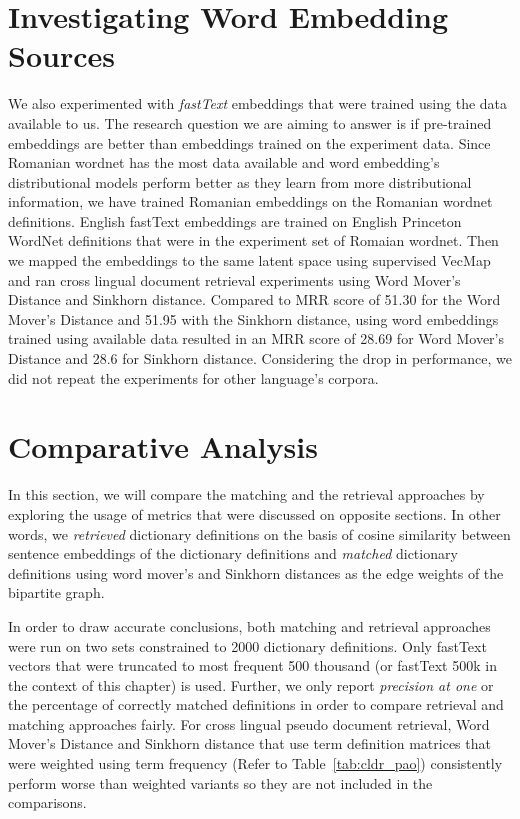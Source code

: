\section{Investigating Word Embedding Sources}%
\label{sec:investigating_word_embedding_sources}

We also experimented with \emph{fastText} embeddings that were trained using the data available to us.
The research question we are aiming to answer is if pre-trained embeddings are better than embeddings trained on the experiment data.
Since Romanian wordnet has the most data available and word embedding's distributional models perform better as they learn from more distributional information, we have trained Romanian embeddings on the Romanian wordnet definitions.
English fastText embeddings are trained on English Princeton WordNet definitions that were in the experiment set of Romaian wordnet.
Then we mapped the embeddings to the same latent space using supervised VecMap and ran cross lingual document retrieval experiments using Word Mover's Distance and Sinkhorn distance.
Compared to MRR score of 51.30 for the Word Mover's Distance and 51.95 with the Sinkhorn distance, using word embeddings trained using available data resulted in an MRR score of 28.69 for Word Mover's Distance and 28.6 for Sinkhorn distance.
Considering the drop in performance, we did not repeat the experiments for other language's corpora.

\section{Comparative Analysis}%
\label{sec:comparative_analysis}

In this section, we will compare the matching and the retrieval approaches by exploring the usage of metrics that were discussed on opposite sections.
In other words, we \emph{retrieved} dictionary definitions on the basis of cosine similarity between sentence embeddings of the dictionary definitions and \emph{matched} dictionary definitions using word mover's and Sinkhorn distances as the edge weights of the bipartite graph.

In order to draw accurate conclusions, both matching and retrieval approaches were run on two sets constrained to 2000 dictionary definitions.
Only fastText vectors that were truncated to most frequent 500 thousand (or fastText 500k in the context of this chapter) is used.
Further, we only report \emph{precision at one} or the percentage of correctly matched definitions in order to compare retrieval and matching approaches fairly.
For cross lingual pseudo document retrieval, Word Mover's Distance and Sinkhorn distance that use term definition matrices that were weighted using term frequency (Refer to Table~\ref{tab:cldr_pao}) consistently perform worse than \tfidf{} weighted variants so they are not included in the comparisons.

